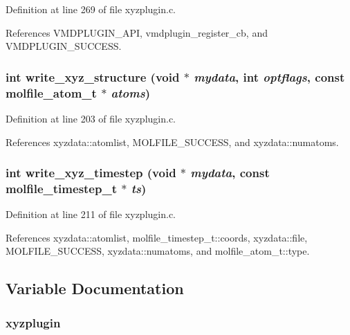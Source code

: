 Definition at line 269 of file xyzplugin.c.

References VMDPLUGIN\_\-API, vmdplugin\_\-register\_\-cb, and VMDPLUGIN\_\-SUCCESS.
\subsubsection{\setlength{\rightskip}{0pt plus 5cm}int write\_\-xyz\_\-structure (void $\ast$ {\em mydata}, int {\em optflags}, const {\bf molfile\_\-atom\_\-t} $\ast$ {\em atoms})\hspace{0.3cm}{\tt  [static]}}\label{xyzplugin_8c_a6}




Definition at line 203 of file xyzplugin.c.

References xyzdata::atomlist, MOLFILE\_\-SUCCESS, and xyzdata::numatoms.
\subsubsection{\setlength{\rightskip}{0pt plus 5cm}int write\_\-xyz\_\-timestep (void $\ast$ {\em mydata}, const {\bf molfile\_\-timestep\_\-t} $\ast$ {\em ts})\hspace{0.3cm}{\tt  [static]}}\label{xyzplugin_8c_a7}




Definition at line 211 of file xyzplugin.c.

References xyzdata::atomlist, molfile\_\-timestep\_\-t::coords, xyzdata::file, MOLFILE\_\-SUCCESS, xyzdata::numatoms, and molfile\_\-atom\_\-t::type.

\subsection{Variable Documentation}
\subsubsection{ xyzplugin\hspace{0.3cm}{\tt  [static]}}\label{xyzplugin_8c_a0}


